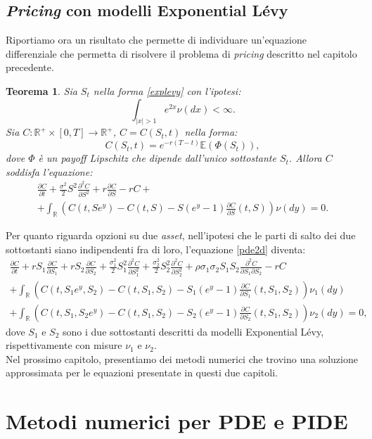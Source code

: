 \documentclass[a4paper,10pt]{report}
\newcommand{\der}[2]{\frac{\partial #1}{\partial #2}}
\newcommand{\dder}[2]{\frac{\partial^2 #1}{\partial #2^2}}
\newcommand{\dmix}[3]{\frac{\partial^2 #1}{\partial #2 \partial #3}}
\theoremstyle{plain}
\newtheorem{theorem}{Teorema}[chapter]
\theoremstyle{definition}
\theoremstyle{remark}
\begin{document}
\section{\emph{Pricing} con modelli Exponential L\'evy}
Riportiamo ora un risultato che permette di individuare un'equazione differenziale che permetta di risolvere il problema di \emph{pricing} descritto nel capitolo precedente.
\begin{theorem}
Sia $S_t$ nella forma \ref{explevy} con l'ipotesi: $$\int_{|x|>1} e^{2x}\nu(dx)<\infty.$$ Sia $C:\mathbb{R}^+\times[0,T]\rightarrow\mathbb{R}^+$, $C=C(S_t,t)$ nella forma: $$C(S_t,t)=e^{-r(T-t)}\mathbb{E}(\Phi(S_t)),$$ dove $\Phi$ \`e un \emph{payoff Lipschitz} che dipende dall'unico sottostante $S_t$. Allora $C$ soddisfa l'equazione:
\begin{multline}
\der{C}{t}+\frac{\sigma^2}{2}S^2\dder{C}{S}+r\der{C}{S}-rC+\\+ \int_\mathbb{R}\left(C(t,Se^y)-C(t,S)-S(e^y-1)\der{C}{S}(t,S)\right)\nu(dy)=0.
\end{multline}
\end{theorem}
Per quanto riguarda opzioni su due \emph{asset}, nell'ipotesi che le parti di salto dei due sottostanti siano indipendenti fra di loro, l'equazione \ref{pde2d} diventa:
\begin{multline}
\der{C}{t}+rS_1\der{C}{S_1}+rS_2\der{C}{S_2}+\frac{\sigma^2_1}{2}S_1^2\dder{C}{S_1}+\frac{\sigma^2_2}{2}S_2^2\dder{C}{S_2}+\rho\sigma_1\sigma_2S_1S_2\dmix{C}{S_1}{S_2}-rC\\+\int_\mathbb{R}\left(C(t,S_1e^y,S_2)-C(t,S_1,S_2)-S_1(e^y-1)\der{C}{S_1}(t,S_1,S_2)\right)\nu_1(dy)\\+\int_\mathbb{R}\left(C(t,S_1,S_2e^y)-C(t,S_1,S_2)-S_2(e^y-1)\der{C}{S_2}(t,S_1,S_2)\right)\nu_2(dy)=0,
\label{pide2d}
\end{multline}
dove $S_1$ e $S_2$ sono i due sottostanti descritti da modelli Exponential L\'evy, rispettivamente con misure $\nu_1$ e $\nu_2$.\\Nel prossimo capitolo, presentiamo dei metodi numerici che trovino una soluzione approssimata per le equazioni presentate in questi due capitoli.

\chapter{Metodi numerici per PDE e PIDE}
\end{document}
